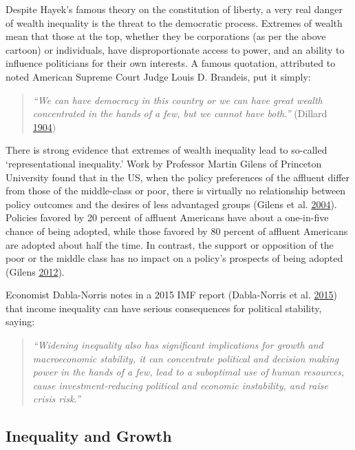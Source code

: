 \documentclass[]{tufte-handout}
\begin{document}
Despite Hayek's famous theory on the constitution of liberty, a very
real danger of wealth inequality is the threat to the democratic
process. Extremes of wealth mean that those at the top, whether they be
corporations (as per the above cartoon) or individuals, have
disproportionate access to power, and an ability to influence
politicians for their own interests. A famous quotation, attributed to
noted American Supreme Court Judge Louis D. Brandeis, put it simply:

\begin{quote}
\emph{``We can have democracy in this country or we can have great
wealth concentrated in the hands of a few, but we cannot have both.''}
(Dillard \protect\hyperlink{ref-Dillard1904}{1904})
\end{quote}

There is strong evidence that extremes of wealth inequality lead to
so-called `representational inequality.' Work by Professor Martin Gilens
of Princeton University found that in the US, when the policy
preferences of the affluent differ from those of the middle-class or
poor, there is virtually no relationship between policy outcomes and the
desires of less advantaged groups (Gilens et al.
\protect\hyperlink{ref-Gilens2004}{2004}). Policies favored by 20
percent of affluent Americans have about a one-in-five chance of being
adopted, while those favored by 80 percent of affluent Americans are
adopted about half the time. In contrast, the support or opposition of
the poor or the middle class has no impact on a policy's prospects of
being adopted (Gilens \protect\hyperlink{ref-Gilens2012}{2012}).

Economist Dabla-Norris notes in a 2015 IMF report (Dabla-Norris et al.
\protect\hyperlink{ref-Dabla-Norris2015}{2015}) that income inequality
can have serious consequences for political stability, saying:

\begin{quote}
\emph{``Widening inequality also has significant implications for growth
and macroeconomic stability, it can concentrate political and decision
making power in the hands of a few, lead to a suboptimal use of human
resources, cause investment-reducing political and economic instability,
and raise crisis risk.''}
\end{quote}

\hypertarget{inequality-and-growth}{%
\subsection{Inequality and Growth}\label{inequality-and-growth}}
\end{document}
